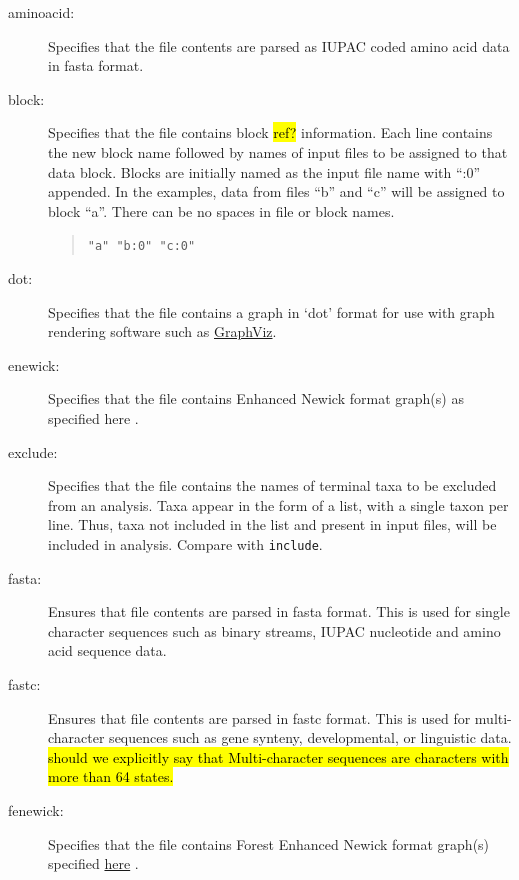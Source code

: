 	\begin{description}
		\item [aminoacid:] Specifies that the file contents are parsed as IUPAC coded amino 
		acid data in fasta \citep{PearsonandLipman1988} format.

		\item [block:] Specifies that the file contains block \hl{ref?} information. Each line contains 
		the new block name followed by names of input files to be assigned to that data block. 
		Blocks are initially named as the input file name with ``:0'' appended. In the examples, 
		data from files ``b'' and ``c'' will be assigned to block ``a''. There can be no spaces in 
		file or block names.
			
			\begin{quote}
					\texttt{"a" "b:0" "c:0"}
			\end{quote}
	
		\item [dot:] Specifies that the file contains a graph in `dot' format for use with graph 
		rendering software such as \href{https://en.wikipedia.org/wiki/Graphviz}{GraphViz}.
			
		\item [enewick:] Specifies that the file contains Enhanced Newick format graph(s) as
		specified here \citep{Cardonaetal2008}. 
			
		\item [exclude:] Specifies that the file contains the names of terminal taxa to be 
		excluded from an analysis. Taxa appear in the form of a list, with a single taxon per 
		line. Thus, taxa not included in the list and present in input files, will be included in 
		analysis. Compare with \texttt{include}.
			
		\item [fasta:] Ensures that file contents are parsed in fasta \citep{PearsonandLipman1988}
		format. This is used for single character sequences such as binary streams, IUPAC 
		nucleotide and amino acid sequence data.
			
		\item [fastc:] Ensures that file contents are parsed in fastc \citep{WheelerandWashburn2019}
		format. This is used for multi-character sequences such as gene synteny, developmental, 
		or linguistic data. \hl{should we explicitly say that Multi-character sequences are characters
		with more than 64 states.}
			
		\item [fenewick:] Specifies that the file contains Forest Enhanced Newick format graph(s)  
		specified \href{https://www.github.com/wardwheeler/euncon}{here} \citep{Wheeler2021a}.
			

\end{description}
